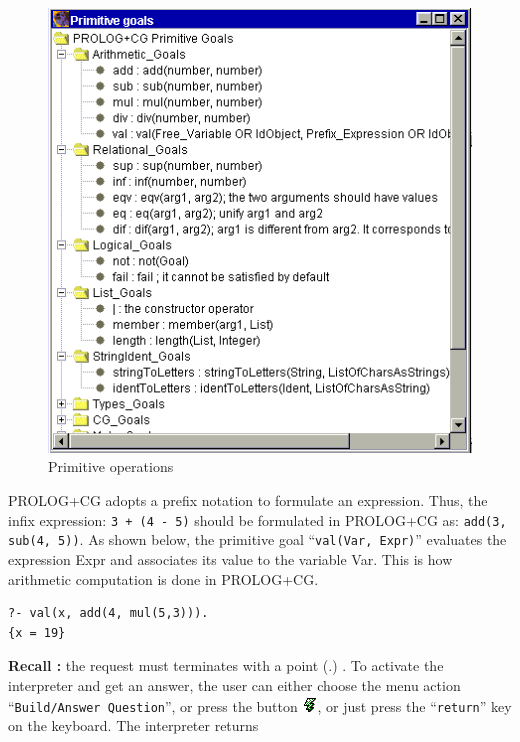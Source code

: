 \documentclass{book}
\begin{document}
\begin{htmlonly}

\begin{figure}
\begin{center}
\includegraphics{EnvPrimHier2.png}
\end{center}
\caption{\label{EnvPrimHier2}Primitive operations}
\end{figure}

\end{htmlonly}


PROLOG+CG adopts a prefix notation to formulate an expression. Thus,
the infix expression: \texttt{3 + (4 - 5)} should be formulated in
PROLOG+CG as: \texttt{add(3, sub(4, 5))}. As shown below, the
primitive goal ``\texttt{val(Var, Expr)}'' evaluates the expression
Expr and associates its value to the variable Var. This is how
arithmetic computation is done in PROLOG+CG.

\begin{verbatim}
?- val(x, add(4, mul(5,3))).
{x = 19}
\end{verbatim}

{\bf Recall :} the request must terminates with a point (.) . To
activate the interpreter and get an answer, the user can either choose
the menu action ``\texttt{Build/Answer Question}'', or press the
button \includegraphics{shortcut.png}, or just press the
``\texttt{return}'' key on the keyboard. The interpreter returns
\end{document}
